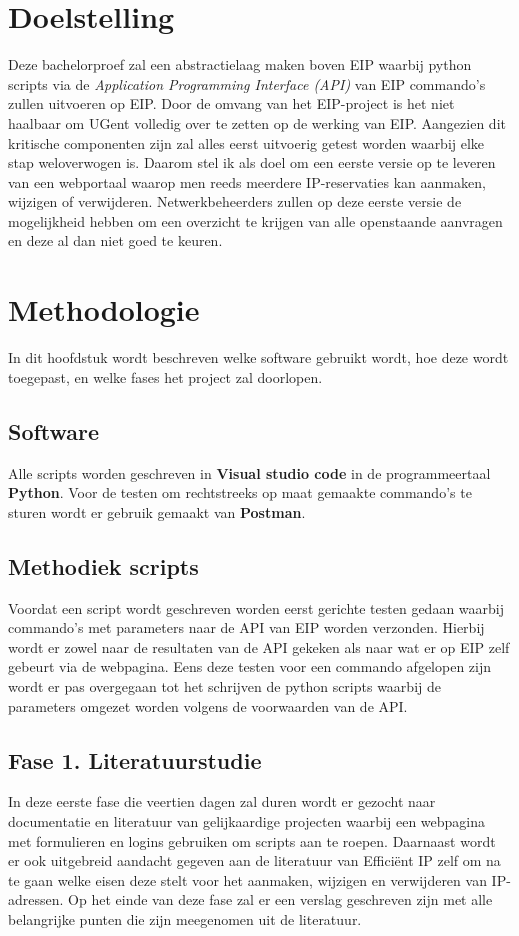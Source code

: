 \documentclass{hogent-article}
\begin{document}
\section{Doelstelling}
\label{sec:doelstelling}
Deze bachelorproef zal een abstractielaag maken boven EIP waarbij python scripts via de \textit{Application Programming Interface (API)} van EIP commando's zullen uitvoeren op EIP.
Door de omvang van het EIP-project is het niet haalbaar om UGent volledig over te zetten op de werking van EIP. Aangezien dit kritische componenten zijn zal alles eerst uitvoerig getest worden waarbij elke stap weloverwogen is.
Daarom stel ik als doel om een eerste versie op te leveren van een webportaal waarop men reeds meerdere IP-reservaties kan aanmaken, wijzigen of verwijderen. Netwerkbeheerders zullen op deze eerste versie de mogelijkheid hebben om een overzicht te krijgen van alle openstaande aanvragen en deze al dan niet goed te keuren.

\section{Methodologie}
\label{sec:methodologie}
In dit hoofdstuk wordt beschreven welke software gebruikt wordt, hoe deze wordt toegepast, en welke fases het project zal doorlopen.

\subsection{Software}
Alle scripts worden geschreven in \textbf{Visual studio code} in de programmeertaal \textbf{Python}.
Voor de testen om rechtstreeks op maat gemaakte commando's te sturen wordt er gebruik gemaakt van \textbf{Postman}.

\subsection{Methodiek scripts}
Voordat een script wordt geschreven worden eerst gerichte testen gedaan waarbij commando's met parameters naar de API van EIP worden verzonden. Hierbij wordt er zowel naar de resultaten van de API gekeken als naar wat er op EIP zelf gebeurt via de webpagina. Eens deze testen voor een commando afgelopen zijn wordt er pas overgegaan tot het schrijven de python scripts waarbij de parameters omgezet worden volgens de voorwaarden van de API.

\subsection{Fase 1. Literatuurstudie}
In deze eerste fase die veertien dagen zal duren wordt er gezocht naar documentatie en literatuur van gelijkaardige projecten waarbij een webpagina met formulieren en logins gebruiken om scripts aan te roepen. Daarnaast wordt er ook uitgebreid aandacht gegeven aan de literatuur van Efficiënt IP zelf om na te gaan welke eisen deze stelt voor het aanmaken, wijzigen en verwijderen van IP-adressen.
Op het einde van deze fase zal er een verslag geschreven zijn met alle belangrijke punten die zijn meegenomen uit de literatuur.
\end{document}
